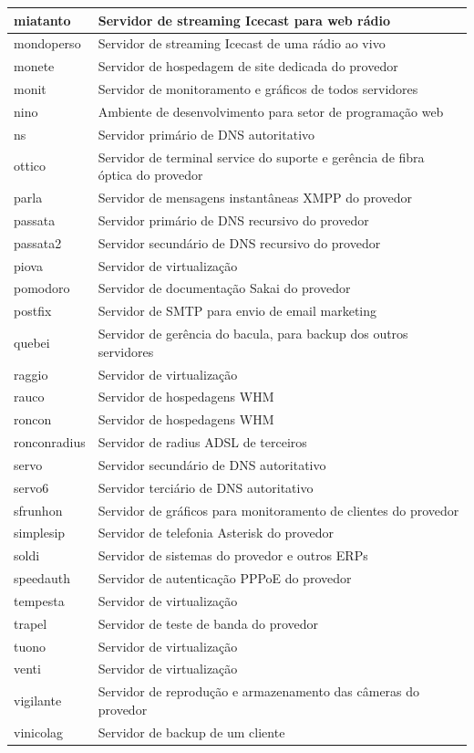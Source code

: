 \begin{table}
\begin{center}
\begin{tabular}{|l|p{12cm}|}
miatanto & Servidor de streaming Icecast para web rádio\\\hline
mondoperso & Servidor de streaming Icecast de uma rádio ao vivo\\\hline
monete & Servidor de hospedagem de site dedicada do provedor\\\hline
monit & Servidor de monitoramento e gráficos de todos servidores\\\hline
nino & Ambiente de desenvolvimento para setor de programação web\\\hline
ns & Servidor primário de DNS autoritativo\\\hline
ottico & Servidor de terminal service do suporte e gerência de fibra óptica do provedor\\\hline
parla & Servidor de mensagens instantâneas XMPP do provedor\\\hline
passata & Servidor primário de DNS recursivo do provedor\\\hline
passata2 & Servidor secundário de DNS recursivo do provedor\\\hline
piova & Servidor de virtualização\\\hline
pomodoro & Servidor de documentação Sakai do provedor\\\hline
postfix & Servidor de SMTP para envio de email marketing\\\hline
quebei & Servidor de gerência do bacula, para backup dos outros servidores\\\hline
raggio & Servidor de virtualização\\\hline
rauco & Servidor de hospedagens WHM\\\hline
roncon & Servidor de hospedagens WHM\\\hline
ronconradius & Servidor de radius ADSL de terceiros\\\hline
servo & Servidor secundário de DNS autoritativo\\\hline
servo6 & Servidor terciário de DNS autoritativo\\\hline
sfrunhon & Servidor de gráficos para monitoramento de clientes do provedor\\\hline
simplesip & Servidor de telefonia Asterisk do provedor\\\hline
soldi & Servidor de sistemas do provedor e outros ERPs\\\hline
speedauth & Servidor de autenticação PPPoE do provedor\\\hline
tempesta & Servidor de virtualização\\\hline
trapel & Servidor de teste de banda do provedor\\\hline
tuono & Servidor de virtualização\\\hline
venti & Servidor de virtualização\\\hline
vigilante & Servidor de reprodução e armazenamento das câmeras do provedor\\\hline
vinicolag & Servidor de backup de um cliente\\\hline
\end{tabular}
\end{center}
\end{table}


